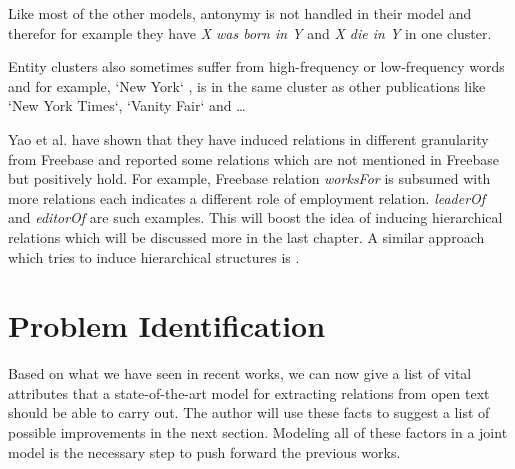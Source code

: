  Like most of the other models, antonymy is not handled in their model and therefor for example they have
 \emph{X was born in Y} and \emph{X die in Y} in one cluster.
 
 Entity clusters also sometimes suffer from high-frequency or low-frequency words and for example, `New York`
 , is in the same cluster as other publications like `New York Times`, `Vanity Fair` and \ldots
 
 Yao et al. have shown that they have induced relations in different granularity from Freebase and reported some relations
 which are not mentioned in Freebase but positively hold. For example, Freebase relation \emph{worksFor}
  is subsumed with more relations each indicates a different role of employment relation. \emph{leaderOf}
   and \emph{editorOf} are such examples. This will boost the idea of inducing hierarchical 
   relations which will be discussed more in the last chapter. A similar approach which tries to induce
    hierarchical structures is \cite{Alfonseca2012} .

 \section{Problem Identification}
\label{sec:prob-id}

Based on what we have seen in recent works, we can now give a list of vital
attributes that a state-of-the-art model for extracting relations from open text
should be able to carry out. The author will use these facts to suggest a list of possible improvements
in the next section. Modeling all of
these factors in a joint model is the necessary step to push forward the previous
works.

